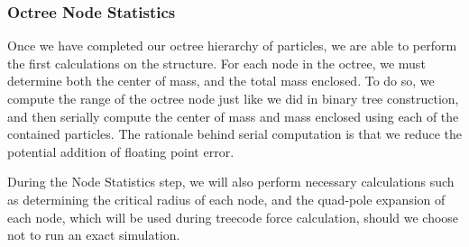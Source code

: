 \documentclass{thesis}
\begin{document}

\subsubsection{Octree Node Statistics} %
Once we have completed our octree hierarchy of particles, we are able to perform the first calculations on the structure. For each node in the octree, we must determine both the center of mass, and the total mass enclosed. To do so, we compute the range of the octree node just like we did in binary tree construction, and then serially compute the center of mass and mass enclosed using each of the contained particles. The rationale behind serial computation is that we reduce the potential addition of floating point error.

During the Node Statistics step, we will also perform necessary calculations such as determining the critical radius of each node, and the quad-pole expansion of each node, which will be used during treecode force calculation, should we choose not to run an exact simulation.

\end{document}
